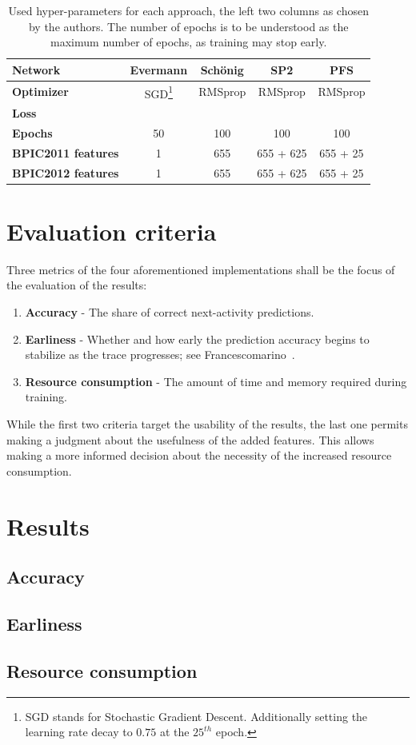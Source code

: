 \begin{table}[ht!]
    \centering
    \begin{tabular}{lcccc}
        \textbf{Network} & Evermann & Schönig & SP2 & PFS\\
        \hline
        \textbf{Optimizer} & SGD\footnote{SGD stands for Stochastic Gradient Descent. Additionally setting the learning rate decay to $0.75$ at the $25^{th}$ epoch.} & RMSprop  & RMSprop & RMSprop\\
        \textbf{Loss}    & & & &\\
        \textbf{Epochs}  & 50 & 100 & 100 & 100\\
        \textbf{BPIC2011 features} & 1 & 655 & 655 + 625 & 655 + 25 \\
        \textbf{BPIC2012 features} & 1 & 655 & 655 + 625 & 655 + 25 \\
    \end{tabular}
    \caption{Used hyper-parameters for each approach, the left two columns as chosen by the authors. The number of epochs is to be understood as the maximum number of epochs, as training may stop early.}
    \label{tab:network-info}
\end{table}

\section{Evaluation criteria}
\label{sec:eval:criteria}
Three metrics of the four aforementioned implementations shall be the focus of the evaluation of the results:

\begin{enumerate}
    \item\textbf{Accuracy} - The share of correct next-activity predictions.
    \item\textbf{Earliness} - Whether and how early the prediction accuracy begins to stabilize as the trace progresses; see Francescomarino~\cite{francescomarino2015}.
    \item\textbf{Resource consumption} - The amount of time and memory required during training.
\end{enumerate}

While the first two criteria target the usability of the results, the last one permits making a judgment about the usefulness of the added features. This allows making a more informed decision about the necessity of the increased resource consumption.

\section{Results}
\label{sec:eval:results}


\subsection*{Accuracy}
\subsection*{Earliness}
\subsection*{Resource consumption}

